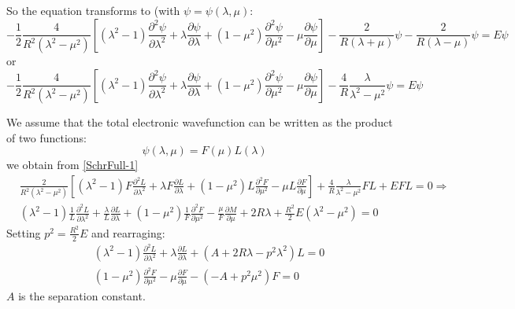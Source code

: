 So the equation transforms to (with $ \psi = \psi(\lambda, \mu) $:
\begin{equation}
-\frac{1}{2}\frac{4}{ R^2 (\lambda^2-\mu^2) }\left[(\lambda^2-1)\frac{\partial^2 \psi}{\partial \lambda^2} + \lambda\frac{\partial \psi}{\partial \lambda} + 
(1 - \mu^2)\frac{\partial^2 \psi}{\partial \mu^2} - \mu\frac{\partial \psi}{\partial \mu} \right] - \frac{2}{R(\lambda+\mu)}\psi - \frac{2}{R(\lambda-\mu)}\psi = E \psi
\end{equation}
or
\begin{equation}\label{SchrFull-1}
-\frac{1}{2}\frac{4}{ R^2 (\lambda^2-\mu^2) }\left[(\lambda^2-1)\frac{\partial^2 \psi}{\partial \lambda^2} + \lambda\frac{\partial \psi}{\partial \lambda} + 
(1 - \mu^2)\frac{\partial^2 \psi}{\partial \mu^2} - \mu\frac{\partial \psi}{\partial \mu} \right] - \frac{4}{R}\frac{\lambda}{\lambda^2-\mu^2}\psi = E \psi
\end{equation}

We assume that the total electronic wavefunction can be written as the product of two functions:
\begin{equation}\label{variables2C}
\psi(\lambda,\mu) = F(\mu)L(\lambda)
\end{equation}
we obtain from \eqref{SchrFull-1}
\begin{equation}
\begin{split}
& \frac{2}{ R^2 (\lambda^2-\mu^2) }\left[(\lambda^2-1)F\frac{\partial^2 L}{\partial \lambda^2} + \lambda F\frac{\partial L}{\partial \lambda} + 
(1 - \mu^2)L\frac{\partial^2 F}{\partial \mu^2} - \mu L\frac{\partial F}{\partial \mu} \right] + \frac{4}{R}\frac{\lambda}{\lambda^2-\mu^2} F L + E F L = 0 \Rightarrow \\[.8em]
& (\lambda^2-1)\frac{1}{L}\frac{\partial^2 L}{\partial \lambda^2} + \frac{\lambda}{L}\frac{\partial L}{\partial \lambda} + 
(1 - \mu^2)\frac{1}{F}\frac{\partial^2 F}{\partial \mu^2} - \frac{\mu}{F} \frac{\partial M}{\partial \mu} + 2R\lambda + \frac{R^2}{2} E (\lambda^2 - \mu^2) = 0 
\end{split}
\end{equation}
Setting $ p^2 = \frac{R^2}{2}E $ and rearraging:
\begin{equation}\label{eqLG}
\begin{split}
& (\lambda^2-1)\frac{\partial^2 L}{\partial \lambda^2} + \lambda\frac{\partial L}{\partial \lambda} + \left(A + 2R\lambda - p^2 \lambda^2\right) L = 0 \\[.8em]
& (1 - \mu^2)\frac{\partial^2 F}{\partial \mu^2} - \mu\frac{\partial F}{\partial \mu} - \left(-A + p^2 \mu^2\right) F = 0
\end{split}
\end{equation}
$ A $ is the separation constant.


